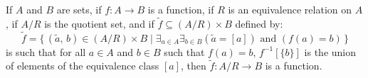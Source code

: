     \begin{theorem}
        If $A$ and $B$ are sets, if $f:A\rightarrow{B}$ is a function, if
        $R$ is an equivalence relation on $A$, if $A/R$ is the quotient set, and
        if $\tilde{f}\subseteq(A/R)\times{B}$ defined by:
        \begin{equation}
            \tilde{f}=\{\,(\tilde{a},\,b)\in(A/R)\times{B}\;|\;
                \exists_{a\in{A}}\exists_{b\in{B}}(\tilde{a}=[a])
                \textrm{ and }(f(a)=b)\,\}
        \end{equation}
        is such that for all $a\in{A}$ and $b\in{B}$ such that $f(a)=b$,
        $f^{\minus{1}}[\{b\}]$ is the union of elements of the equivalence class
        $[a]$, then $\tilde{f}:A/R\rightarrow{B}$ is a function.
    \end{theorem}

